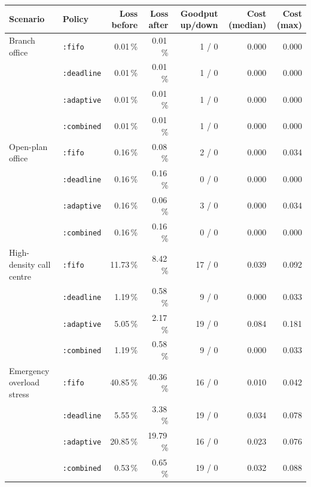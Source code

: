 \begin{tabular}{llrrrrr}
\toprule
Scenario & Policy & Loss before & Loss after & Goodput up/down & Cost (median) & Cost (max) \\
\midrule
Branch office & \texttt{:fifo} & 0.01\,\% & 0.01\,\% & 1 / 0 & 0.000 & 0.000 \\
 & \texttt{:deadline} & 0.01\,\% & 0.01\,\% & 1 / 0 & 0.000 & 0.000 \\
 & \texttt{:adaptive} & 0.01\,\% & 0.01\,\% & 1 / 0 & 0.000 & 0.000 \\
 & \texttt{:combined} & 0.01\,\% & 0.01\,\% & 1 / 0 & 0.000 & 0.000 \\
Open-plan office & \texttt{:fifo} & 0.16\,\% & 0.08\,\% & 2 / 0 & 0.000 & 0.034 \\
 & \texttt{:deadline} & 0.16\,\% & 0.16\,\% & 0 / 0 & 0.000 & 0.000 \\
 & \texttt{:adaptive} & 0.16\,\% & 0.06\,\% & 3 / 0 & 0.000 & 0.034 \\
 & \texttt{:combined} & 0.16\,\% & 0.16\,\% & 0 / 0 & 0.000 & 0.000 \\
High-density call centre & \texttt{:fifo} & 11.73\,\% & 8.42\,\% & 17 / 0 & 0.039 & 0.092 \\
 & \texttt{:deadline} & 1.19\,\% & 0.58\,\% & 9 / 0 & 0.000 & 0.033 \\
 & \texttt{:adaptive} & 5.05\,\% & 2.17\,\% & 19 / 0 & 0.084 & 0.181 \\
 & \texttt{:combined} & 1.19\,\% & 0.58\,\% & 9 / 0 & 0.000 & 0.033 \\
Emergency overload stress & \texttt{:fifo} & 40.85\,\% & 40.36\,\% & 16 / 0 & 0.010 & 0.042 \\
 & \texttt{:deadline} & 5.55\,\% & 3.38\,\% & 19 / 0 & 0.034 & 0.078 \\
 & \texttt{:adaptive} & 20.85\,\% & 19.79\,\% & 16 / 0 & 0.023 & 0.076 \\
 & \texttt{:combined} & 0.53\,\% & 0.65\,\% & 19 / 0 & 0.032 & 0.088 \\
\bottomrule
\end{tabular}
